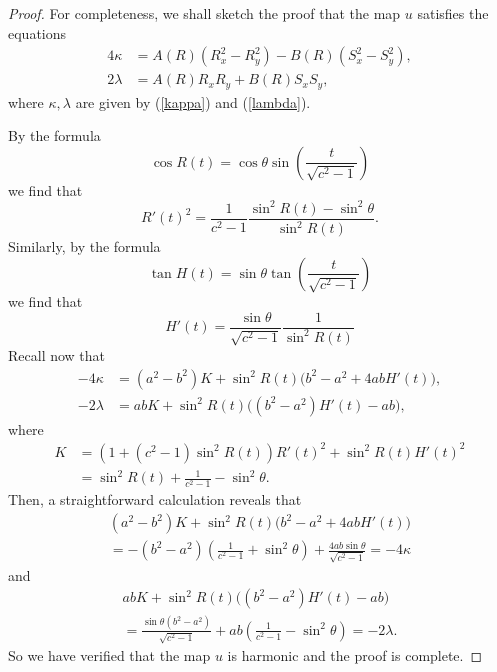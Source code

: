 \documentclass[10pt,a4paper]{amsart}
\begin{document}
\begin{proof}
		
		
		For completeness, we shall sketch the proof that the map $u$ satisfies the equations 
		\begin{align*}
			4\kappa &= A(R)(R_x^2 - R_y^2) - B(R)(S_x^2 - S_y^2),
			\\
			2\lambda &= A(R)R_xR_y + B(R)S_xS_y,
		\end{align*}
		where $\kappa, \lambda$ are given by (\ref{kappa}) and (\ref{lambda}).
		
		By the formula 
		\[
		\cos{R(t)}=\cos\theta\sin\left(\frac{t}{\sqrt{c^2-1}}\right)
		\]
		we find that 
		\[
		R'(t)^2 =\frac{1}{c^2-1}\frac{\sin^2{R(t)}-\sin^2{\theta}}{\sin^2{R(t)}}.
		\]
		Similarly, by the formula
		\[
		\tan{H(t)}=\sin{\theta}
		\tan
		\left(\frac{t}{\sqrt{c^2-1}}
		\right)
		\]
		we find that
		\[
		H'(t)=\frac{\sin{\theta}}{\sqrt{c^2-1}}\frac{1}{\sin^2{R(t)}}
		\]
		Recall now that 
		\begin{align*}
			- 4\kappa
			&=
			(a^{2}-b^{2})K
			+ \sin^2{R(t)}\big(b^{2}-a^{2}+4abH'(t)\big),\\[0.3em]
			-2\lambda
			&=
			abK
			+\sin^2{R(t)}\big( (b^{2}-a^{2})H'(t) - ab\big),
		\end{align*}
		where
		\begin{align*}
			K &= (1+(c^2-1)\sin^2{R(t)}) R'(t)^{2}+\sin^2{R(t)} H'(t)^{2}\\
			&=\sin^2{R(t)} + \frac{1}{c^2-1} - \sin^2\theta.
		\end{align*}
		Then, a straightforward calculation reveals that
		\begin{align*}
			(a^{2}-b^{2})K+\sin^2{R(t)}\big(b^{2}-a^{2}+4abH'(t)\big)
			\\=-(b^2 - a^2)
			\left(\frac{1}{c^2 - 1} + \sin^2\theta\right) +
			\frac{4ab\sin\theta}{\sqrt{c^2 - 1}} =-4\kappa
		\end{align*}
		and 
		\begin{align*}
			abK+  \sin^2{R(t)}\big( (b^{2}-a^{2})H'(t) - ab\big)
			\\=\frac{\sin\theta(b^2 - a^2)}{\sqrt{c^2 - 1}}
			+ab\left(\frac{1}{c^2 - 1} - \sin^2\theta\right)=-2\lambda.
		\end{align*}
		So we have verified that the map $u$ is harmonic and the proof is complete.
	\end{proof}
\end{document}
